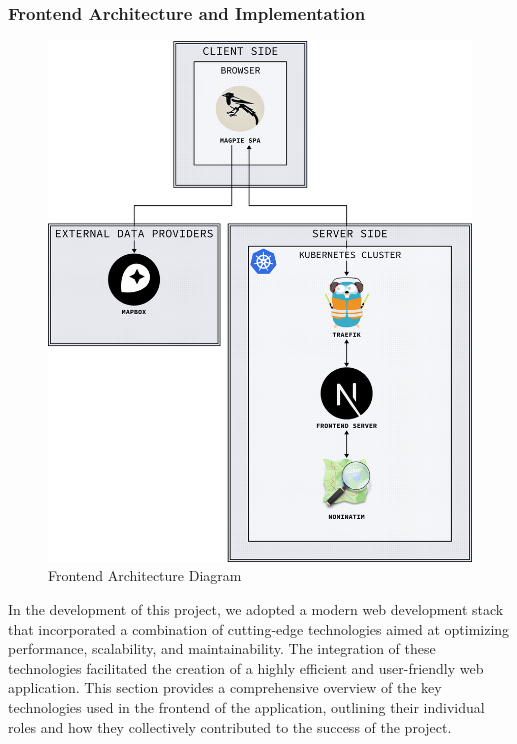 \subsubsection{Frontend Architecture and Implementation}

\begin{figure}[htbp]
  \centering{}
  \includegraphics[width=0.85\columnwidth]{../d2-diagrams/system-diagram/system-diagram-frontend.png}
  \caption{Frontend Architecture Diagram}
  \label{fig:arcgis}
\end{figure}

\newpage{}

In the development of this project, we adopted a modern web development stack
that incorporated a combination of cutting{-}edge technologies aimed at
optimizing performance, scalability, and maintainability. The integration of
these technologies facilitated the creation of a highly efficient and
user{-}friendly web application. This section provides a comprehensive overview
of the key technologies used in the frontend of the application, outlining their
individual roles and how they collectively contributed to the success of the
project.

\vspace{0.5cm}

